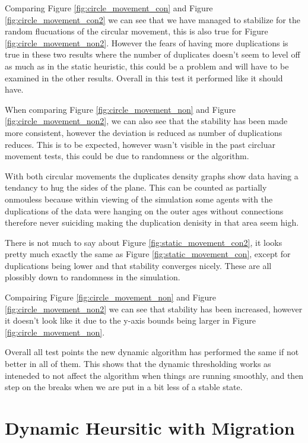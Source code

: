 \documentclass{UoYCSproject}
\begin{document}
Comparing Figure \ref{fig:circle_movement_con} and Figure \ref{fig:circle_movement_con2} we can see that we have managed to stabilize for the random flucuations of the circular movement, this is also true for Figure \ref{fig:circle_movement_non2}.
However the fears of having more duplications is true in these two results where the number of duplicates doesn't seem to level off as much as in the static heuristic, this could be a problem and will have to be examined in the other results.
Overall in this test it performed like it should have.

When comparing Figure \ref{fig:circle_movement_non} and Figure \ref{fig:circle_movement_non2}, we can also see that the stability has been made more consistent, however the deviation is reduced as number of duplications reduces.
This is to be expected, however wasn't visible in the past circluar movement tests, this could be due to randomness or the algorithm.

With both circular movements the duplicates density graphs show data having a tendancy to hug the sides of the plane.
This can be counted as partially onmouless because within viewing of the simulation some agents with the duplications of the data were hanging on the outer ages without connections therefore never suiciding making the duplication denisity in that area seem high.

There is not much to say about Figure \ref{fig:static_movement_con2}, it looks pretty much exactly the same as Figure \ref{fig:static_movement_con}, except for duplications being lower and that stability converges nicely.
These are all plossibly down to randomness in the simulation.

Compairing Figure \ref{fig:circle_movement_non} and Figure \ref{fig:circle_movement_non2} we can see that stability has been increased, however it doesn't look like it due to the y-axis bounds being larger in Figure \ref{fig:circle_movement_non}.

Overall all test points the new dynamic algorithm has performed the same if not better in all of them.
This shows that the dynamic thresholding works as inteneded to not affect the algorithm when things are running smoothly, and then step on the breaks when we are put in a bit less of a stable state.


\section{Dynamic Heursitic with Migration}
\label{sec:Simple4a}
\end{document}
